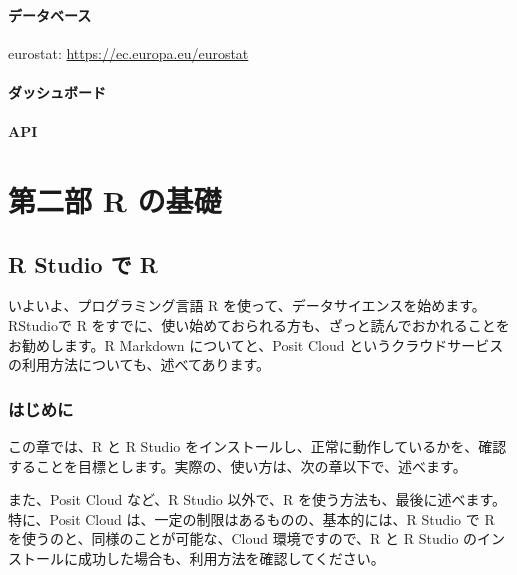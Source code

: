 \documentclass[
  xelatex, ja=standard]{bxjsbook}
\theoremstyle{definition}
\theoremstyle{definition}
\theoremstyle{definition}
\theoremstyle{definition}
\theoremstyle{remark}
\begin{document}
\hypertarget{ux30c7ux30fcux30bfux30d9ux30fcux30b9-6}{%
\subsection{データベース}\label{ux30c7ux30fcux30bfux30d9ux30fcux30b9-6}}

eurostat: \url{https://ec.europa.eu/eurostat}

\hypertarget{ux30c0ux30c3ux30b7ux30e5ux30dcux30fcux30c9-6}{%
\subsection{ダッシュボード}\label{ux30c0ux30c3ux30b7ux30e5ux30dcux30fcux30c9-6}}

\hypertarget{api-6}{%
\subsection{API}\label{api-6}}

\hypertarget{part-ux7b2cux4e8cux90e8-r-ux306eux57faux790e}{%
\part{第二部 R の基礎}\label{part-ux7b2cux4e8cux90e8-r-ux306eux57faux790e}}

\hypertarget{ronrstudio}{%
\chapter{R Studio で R}\label{ronrstudio}}

いよいよ、プログラミング言語 R を使って、データサイエンスを始めます。RStudioで R をすでに、使い始めておられる方も、ざっと読んでおかれることをお勧めします。R Markdown についてと、Posit Cloud というクラウドサービスの利用方法についても、述べてあります。

\hypertarget{ux306fux3058ux3081ux306b}{%
\section{はじめに}\label{ux306fux3058ux3081ux306b}}

この章では、R と R Studio をインストールし、正常に動作しているかを、確認することを目標とします。実際の、使い方は、次の章以下で、述べます。

また、Posit Cloud など、R Studio 以外で、R を使う方法も、最後に述べます。特に、Posit Cloud は、一定の制限はあるものの、基本的には、R Studio で R を使うのと、同様のことが可能な、Cloud 環境ですので、R と R Studio のインストールに成功した場合も、利用方法を確認してください。
\end{document}
